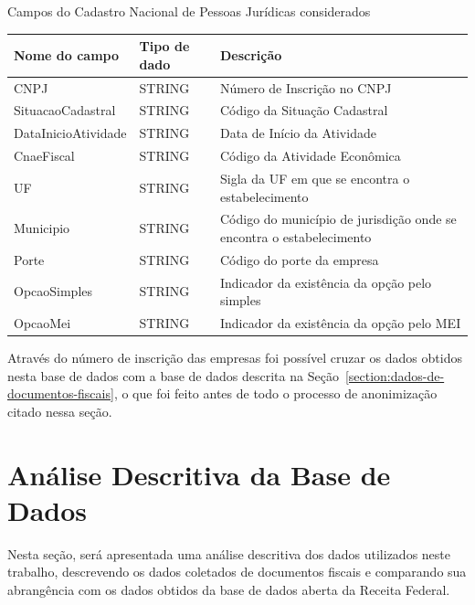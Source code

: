 \begin{quadro}[htb]
\caption{Campos do Cadastro Nacional de Pessoas Jurídicas considerados}
\label{quadro:campos-considerados-cnpj}
\centering
\begin{tabularx}{\textwidth}{|l|l|X|} \hline
\textbf{Nome do campo} & \textbf{Tipo de dado} & \textbf{Descrição}                   \\ \hline
CNPJ                & STRING       & Número de Inscrição no CNPJ                      \\ \hline
SituacaoCadastral   & STRING       & Código da Situação Cadastral                     \\ \hline
DataInicioAtividade & STRING       & Data de Início da Atividade                      \\ \hline
CnaeFiscal          & STRING       & Código da Atividade Econômica                    \\ \hline
UF                  & STRING       & Sigla da UF em que se encontra o estabelecimento \\ \hline
Municipio           & STRING       & Código do município de jurisdição onde se encontra o estabelecimento \\ \hline
Porte               & STRING       & Código do porte da empresa                       \\ \hline
OpcaoSimples        & STRING       & Indicador da existência da opção pelo simples    \\ \hline
OpcaoMei            & STRING       & Indicador da existência da opção pelo MEI        \\ \hline
\end{tabularx}
\end{quadro}

Através do número de inscrição das empresas foi possível cruzar os dados obtidos nesta base de dados com a base de dados descrita na Seção~\ref{section:dados-de-documentos-fiscais}, o que foi feito antes de todo o processo de anonimização citado nessa seção.

\section{Análise Descritiva da Base de Dados}

Nesta seção, será apresentada uma análise descritiva dos dados utilizados neste trabalho, descrevendo os dados coletados de documentos fiscais e comparando sua abrangência com os dados obtidos da base de dados aberta da Receita Federal.

